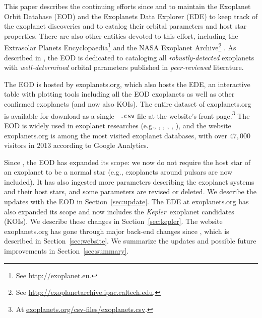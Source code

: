 \documentclass[11pt,preprint]{aastex}
\def\kepler{\textit{Kepler}}
\begin{document}
\begin{CJK*}{UTF8}{gbsn}
This paper describes the continuing efforts since \cite{Butler2006}
and \cite{Wright2011} to maintain the Exoplanet Orbit Database (EOD)
and the Exoplanets Data Explorer (EDE) to keep track of the exoplanet
discoveries and to catalog their orbital parameters and host star
properties. There are also other entities devoted to this effort,
including the Extrasolar Planets Encyclopaedia\footnote{See
  \url{http://exoplanet.eu}.}  \citep{Schneider2011} and the NASA
Exoplanet Archive\footnote{See
  \url{http://exoplanetarchive.ipac.caltech.edu}.}
\citep{Akeson2013}. As described in \cite{Wright2011}, the EOD is
dedicated to cataloging all \emph{robustly-detected} exoplanets with
\emph{well-determined} orbital parameters published in
\emph{peer-reviewed} literature.

The EOD is hosted by exoplanets.org, which also hosts the EDE, an
interactive table with plotting tools including all the EOD exoplanets
as well as other confirmed exoplanets (and now also KOIs). The entire
dataset of exoplanets.org is available for download as a single {\tt
  .csv} file at the website's front page.\footnote{At
  \url{exoplanets.org/csv-files/exoplanets.csv}.} The EOD is widely
used in exoplanet researches (e.g., \citealt{Dawson2013},
\citealt{Howard2013}, \citealt{Kipping2013}, \citealt{Kane2014},
\citealt{Weiss2014}), and the website exoplanets.org is among the most
visited exoplanet databases, with over $47,000$ visitors in 2013
according to Google Analytics.

Since \cite{Wright2011}, the EOD has expanded its scope: we now do
not require the host star of an exoplanet to be a normal star (e.g.,
exoplanets around pulsars are now included). It has also ingested more
parameters describing the exoplanet systems and their host stars, and some
parameters are revised or deleted. We describe the updates with the
EOD in Section~\ref{sec:update}. The EDE at exoplanets.org has also
expanded its scope and now includes the \kepler\ exoplanet candidates
(KOIs). We describe these changes in Section~\ref{sec:kepler}. The
website exoplanets.org has gone through major back-end changes since
\cite{Wright2011}, which is described in Section~\ref{sec:website}. We
summarize the updates and possible future improvements in
Section~\ref{sec:summary}. 

\end{CJK*}
\end{document}
